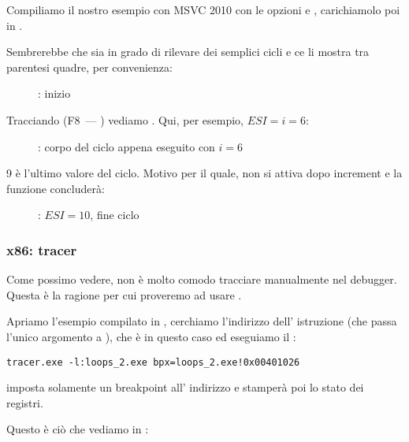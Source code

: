 Compiliamo il nostro esempio con MSVC 2010 con le opzioni \Ox e \Obzero,
carichiamolo poi in \olly.

Sembrerebbe che \olly sia in grado di rilevare dei semplici cicli e ce li mostra tra parentesi quadre, per convenienza:

\begin{figure}[H]
\centering
{}
\caption{\olly: inizio \main}
\label{fig:loops_olly_1}
\end{figure}

Tracciando (F8~--- \stepover) vediamo \ESI 
{}.
Qui, per esempio, $ESI=i=6$:

\begin{figure}[H]
\centering
{}
\caption{\olly: corpo del ciclo appena eseguito con $i=6$}
\label{fig:loops_olly_2}
\end{figure}

9 è l'ultimo valore del ciclo.
Motivo per il quale, \JL non si attiva dopo \gls{increment} e la funzione concluderà:

\begin{figure}[H]
\centering
{}
\caption{\olly: $ESI=10$, fine ciclo}
\label{fig:loops_olly_3}
\end{figure}

\subsubsection{x86: tracer}

Come possimo vedere, non è molto comodo tracciare manualmente nel debugger.
Questa è la ragione per cui proveremo ad usare \tracer.

Apriamo l'esempio compilato in \IDA, cerchiamo l'indirizzo dell' istruzione 
(che passa l'unico argomento a \ttf), che è  in questo caso ed eseguiamo il \tracer:

\begin{lstlisting}
tracer.exe -l:loops_2.exe bpx=loops_2.exe!0x00401026
\end{lstlisting}

 imposta solamente un breakpoint all' indirizzo e \tracer stamperà poi lo stato dei registri.

Questo è ciò che vediamo in  :



